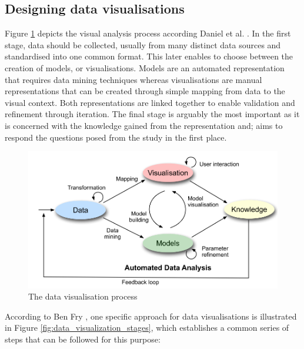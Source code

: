 \subsection{Designing data visualisations}
Figure \ref{fig:data_visualization_process} depicts the visual analysis process according Daniel et al. \cite{KeimDaniel2010}. In the first stage,  data should be collected, usually from many distinct data sources and standardised into one common format. This later enables to choose between the creation of models, or visualisations. Models are an automated representation that requires data mining techniques whereas visualisations are manual representations that can be created through simple mapping from data to the visual context. Both representations are linked together to enable validation and refinement through iteration. The final stage is arguably the most important as it is concerned with the knowledge gained from the representation and; aims to respond the questions posed from the study in the first place.
\begin{figure}[!htb]
\begin{adjustbox}{width=1\textwidth,center=\textwidth}
  \centering
  \includegraphics[scale=1]{images/data_visualization_process.png}
\end{adjustbox}
  \caption[The data visualisation process]{The data visualisation process \cite{KeimDaniel2010} }
  \label{fig:data_visualization_process}
\end{figure}

According to Ben Fry \cite{Cleveland1993}, one specific approach for data visualisations is illustrated in Figure \ref{fig:data_visualization_stages}, which establishes a common series of steps that can be followed for this purpose:

